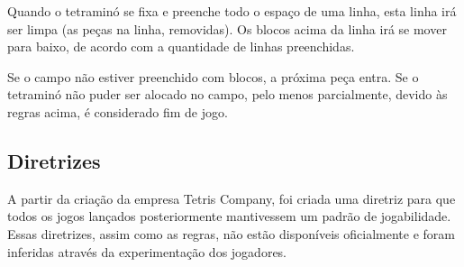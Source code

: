 \documentclass[
	12pt,				%
	openright,			%
	oneside,			%
	a4paper,			%
	brazil,				%
	]{abntex2}
\begin{document}
Quando o tetraminó se fixa e preenche todo o espaço de uma linha, esta linha irá ser limpa (as peças na linha, removidas). Os blocos acima da linha irá se mover para baixo, de acordo com a quantidade de linhas preenchidas.

Se o campo não estiver preenchido com blocos, a próxima peça entra. Se o tetraminó não puder ser alocado no campo, pelo menos parcialmente, devido às regras acima, é considerado fim de jogo.

\subsection{Diretrizes}
\label{subsection1}

A partir da criação da empresa Tetris Company, foi criada uma diretriz para que todos os jogos lançados posteriormente mantivessem um padrão de jogabilidade. Essas diretrizes, assim como as regras, não estão disponíveis oficialmente e foram inferidas através da experimentação dos jogadores.
\end{document}
